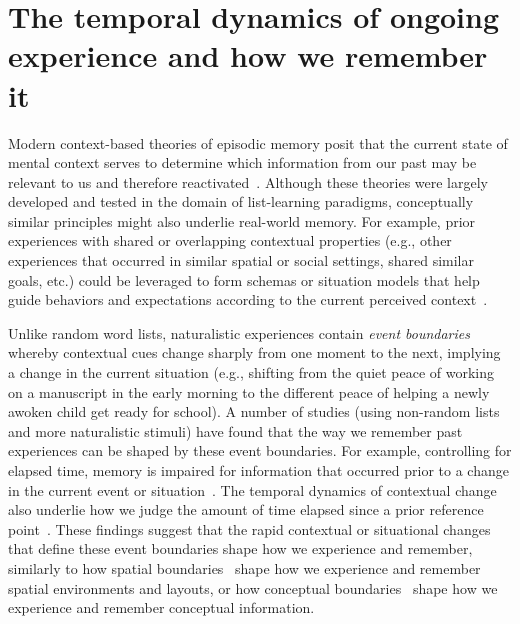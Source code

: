 \documentclass{article}
\begin{document}
\section*{The temporal dynamics of ongoing experience and how we remember it}
Modern context-based theories of episodic memory posit that the current state of mental context serves to determine which information from our past may be relevant to us and therefore reactivated~\citep[e.g., ][]{PolyEtal09}. Although these theories were largely developed and tested in the domain of list-learning paradigms, conceptually similar principles might also underlie real-world memory.  For example, prior experiences with shared or overlapping contextual properties (e.g., other experiences that occurred in similar spatial or social settings, shared similar goals, etc.) could be leveraged to form schemas or situation models that help guide behaviors and expectations according to the current perceived context~\citep{RangRitc12, BaldEtal18, AlyEtal18}.

Unlike random word lists, naturalistic experiences contain \textit{event boundaries} whereby contextual cues change sharply from one moment to the next, implying a change in the current situation (e.g., shifting from the quiet peace of working on a manuscript in the early morning to the different peace of helping a newly awoken child get ready for school).  A number of studies (using non-random lists and more naturalistic stimuli) have found that the way we remember past experiences can be shaped by these event boundaries.  For example, controlling for elapsed time, memory is impaired for information that occurred prior to a change in the current event or situation~\citep[e.g., ][]{RadvCope06, SwalEtal09, SwalEtal11, EzzyDava11, MannEtal16}.  The temporal dynamics of contextual change also underlie how we judge the amount of time elapsed since a prior reference point~\citep{BlocReed78, SahaSmit14}.  These findings suggest that the rapid contextual or situational changes that define these event boundaries shape how we experience and remember, similarly to how spatial boundaries~\citep[e.g., environmental barriers;][]{McKeBuzs16, BrunEtal18} shape how we experience and remember spatial environments and layouts, or how conceptual boundaries~\citep[e.g., distinctions between semantic categories;][]{BrunEtal18} shape how we experience and remember conceptual information.
\end{document}
